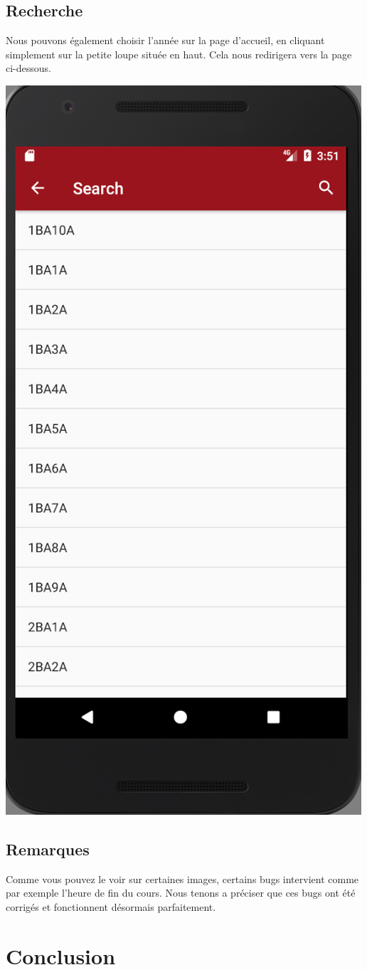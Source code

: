 \documentclass{article}
\begin{document}
	\subsection{Recherche}
	Nous pouvons \'egalement choisir l'ann\'ee sur la page d'accueil, en cliquant simplement sur la petite loupe situ\'ee en haut. Cela nous redirigera vers la page ci-dessous.
            \begin{center}
            \includegraphics[scale=0.4]{img/search.png}
            \end{center}

          \subsection{Remarques}
          Comme vous pouvez le voir sur certaines images, certains bugs intervient comme par exemple l'heure de fin du cours. Nous tenons a pr\'eciser que ces bugs ont \'et\'e corrig\'es et fonctionnent d\'esormais parfaitement.

	\section{Conclusion}
\end{document}
